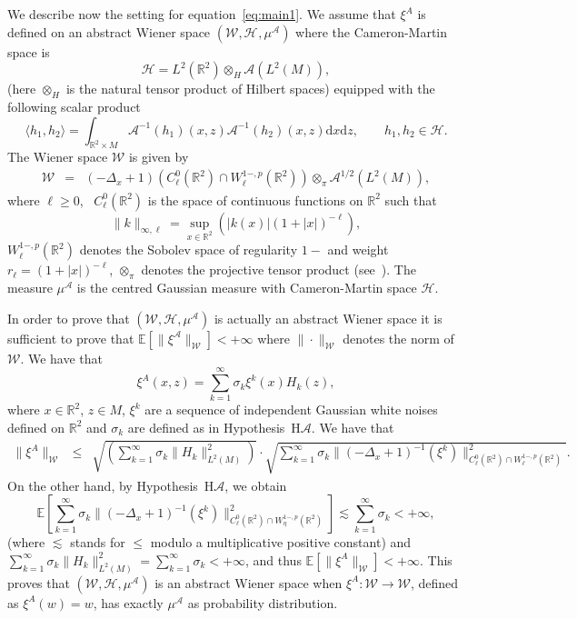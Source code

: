 \documentclass[a4paper,10pt]{article}
\newcommand{\mathd}{\mathrm{d}}
\begin{document}
We describe now the setting for equation~{\eqref{eq:main1}}. We assume that
$\xi^A$ is defined on an abstract Wiener space $(\mathcal{W}, \mathcal{H}^{},
\mu^{\mathcal{A}})$ where the Cameron-Martin space is
\[ \mathcal{H} = L^2 (\mathbb{R}^2) \otimes_H \mathcal{A} (L^2 (M)), \]
(here $\otimes_H$ is the natural tensor product of Hilbert spaces) equipped
with the following scalar product
\[ \langle h_1, h_2 \rangle = \int_{\mathbb{R}^2 \times M} \mathcal{A}^{- 1}
   (h_1) (x, z) \mathcal{A}^{- 1} (h_2) (x, z) \mathd x \mathd z, \qquad h_1,
   h_2 \in \mathcal{H} . \]
The Wiener space $\mathcal{W}$ is given by
\begin{eqnarray}
  \mathcal{W} & = & (- \Delta_x + 1) (C^0_{\ell} (\mathbb{R}^2) \cap W^{1 -,
  p}_{\ell} (\mathbb{R}^2)) \otimes_{\pi} \mathcal{A}^{1 / 2} (L^2 (M)),
  \nonumber
\end{eqnarray}
where $\ell \geqslant 0$, \ $C^0_{\ell} (\mathbb{R}^2)$ is the space of
continuous functions on $\mathbb{R}^2$ such that
\[ \| k \|_{\infty, \ell} = \sup_{x \in \mathbb{R}^2} (| k (x) | (1 + | x
   |)^{- \ell}), \]
$W^{1 -, p}_{\ell} (\mathbb{R}^2)$ denotes the Sobolev space of regularity $1
-$ and weight $r_{\ell} = (1 + | x |)^{- \ell}$, $\otimes_{\pi}$ denotes the
projective tensor product (see~{\cite{Ryan2002}}). The measure
$\mu^{\mathcal{A}}$ is the centred Gaussian measure with Cameron-Martin space
$\mathcal{H}$.

In order to prove that $(\mathcal{W}, \mathcal{H}, \mu^{\mathcal{A}})$ is
actually an abstract Wiener space it is sufficient to prove that $\mathbb{E}
[\| \xi^{\mathcal{A}} \|_{\mathcal{W}}] < + \infty$ where $\| \cdot
\|_{\mathcal{W}}$ denotes the norm of $\mathcal{W}$. We have that
\begin{equation}
  \xi^A (x, z) = \sum_{k = 1}^{\infty} \sigma_k \xi^k (x) H_k (z),
  \label{eq:serie1}
\end{equation}
where $x \in \mathbb{R}^2$, $z \in M$, $\xi^k$ are a sequence of independent
Gaussian white noises defined on $\mathbb{R}^2$ and $\sigma_k$ are defined as
in Hypothesis~H$\mathcal{A}$. We have that
\begin{eqnarray}
  \| \xi^A \|_{\mathcal{W}} & \leqslant & \sqrt{\left( \sum_{k = 1}^{\infty}
  \sigma_k \| H_k \|^2_{L^2 (M)} \right)} \cdot \sqrt{\sum^{\infty}_{k = 1}
  \sigma_k \| (- \Delta_x + 1)^{- 1} (\xi^k) \|^2_{C^0_{\ell} (\mathbb{R}^2)
  \cap W^{1 -, p}_{\ell} (\mathbb{R}^2)}} . \nonumber
\end{eqnarray}
On the other hand, by Hypothesis~H$\mathcal{A}$, we obtain
\[ \mathbb{E} \left[ \sum^{\infty}_{k = 1} \sigma_k \| (- \Delta_x + 1)^{- 1}
   (\xi^k) \|^2_{C^0_{\ell} (\mathbb{R}^2) \cap W^{1 -, p}_{\eta}
   (\mathbb{R}^2)} \right] \lesssim \sum_{k = 1}^{\infty} \sigma_k < + \infty,
\]
(where $\lesssim$ stands for $\leqslant$ modulo a multiplicative positive
constant) and $\sum_{k = 1}^{\infty} \sigma_k \| H_k \|^2_{L^2 (M)} = \sum_{k
= 1}^{\infty} \sigma_k < + \infty$, and thus $\mathbb{E} [\| \xi^A
\|_{\mathcal{W}}] < + \infty$. This proves that $(\mathcal{W}, \mathcal{H},
\mu^{\mathcal{A}})$ is an abstract Wiener space when $\xi^A : \mathcal{W}
\rightarrow \mathcal{W}$, defined as $\xi^A (w) = w$, has exactly
$\mu^{\mathcal{A}}$ as probability distribution.
\end{document}
